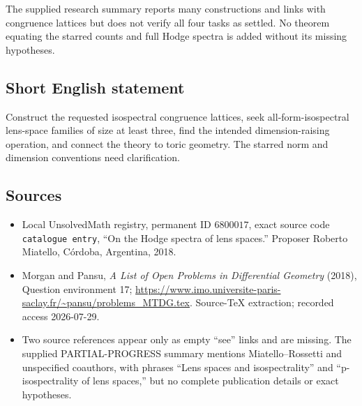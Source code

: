 \documentclass[11pt]{article}
\begin{document}
The supplied research summary reports many constructions and links with congruence lattices but does not verify all four tasks as settled. No theorem equating the starred counts and full Hodge spectra is added without its missing hypotheses.
\subsection{Short English statement}
Construct the requested isospectral congruence lattices, seek all-form-isospectral lens-space families of size at least three, find the intended dimension-raising operation, and connect the theory to toric geometry. The starred norm and dimension conventions need clarification.
\subsection{Sources}
\begin{itemize}
\item Local UnsolvedMath registry, permanent ID \(6800017\), exact source code \texttt{catalogue entry}, ``On the Hodge spectra of lens spaces.'' Proposer Roberto Miatello, Córdoba, Argentina, 2018.
\item Morgan and Pansu, \emph{A List of Open Problems in Differential Geometry} (2018), Question environment 17; \url{https://www.imo.universite-paris-saclay.fr/~pansu/problems_MTDG.tex}. Source-TeX extraction; recorded access 2026-07-29.
\item Two source references appear only as empty ``see'' links and are missing. The supplied PARTIAL-PROGRESS summary mentions Miatello--Rossetti and unspecified coauthors, with phrases ``Lens spaces and isospectrality'' and ``p-isospectrality of lens spaces,'' but no complete publication details or exact hypotheses.
\end{itemize}
\end{document}
